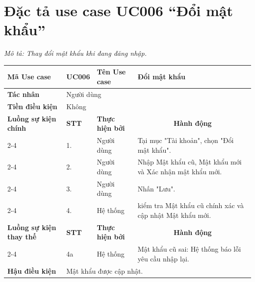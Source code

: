 \section{Đặc tả use case UC006 ``Đổi mật khẩu''}
\textit{Mô tả: Thay đổi mật khẩu khi đang đăng nhập.}
\vspace{0.5cm}

\begingroup
\renewcommand{\arraystretch}{1.5}

\begin{longtable}{|p{2.7cm}|p{0.8cm}|p{2.6cm}|p{7.3cm}|}
\hline
\cellcolor[HTML]{D5F5E3}\textbf{Mã Use case} & \multicolumn{1}{l|}{UC006} & \cellcolor[HTML]{D5F5E3}\textbf{Tên Use case} & Đổi mật khẩu \\ \hline
\cellcolor[HTML]{D5F5E3}\textbf{Tác nhân} & \multicolumn{3}{p{10.7cm}|}{Người dùng} \\ \hline
\cellcolor[HTML]{D5F5E3}\textbf{Tiền điều kiện} & \multicolumn{3}{p{10.7cm}|}{Không} \\ \hline

\cellcolor[HTML]{D5F5E3}\textbf{Luồng sự kiện chính} & \cellcolor[HTML]{FDEBD0}\textbf{STT} & \cellcolor[HTML]{FDEBD0}\textbf{Thực hiện bởi} & \multicolumn{1}{c|}{\cellcolor[HTML]{FDEBD0}\textbf{Hành động}} \\ \cline{2-4} 
\cellcolor[HTML]{D5F5E3} & 1. & Người dùng & Tại mục "Tài khoản", chọn "Đổi mật khẩu". \\ \cline{2-4} 
\cellcolor[HTML]{D5F5E3} & 2. & Người dùng & Nhập Mật khẩu cũ, Mật khẩu mới và Xác nhận mật khẩu mới. \\ \cline{2-4} 
\cellcolor[HTML]{D5F5E3} & 3. & Người dùng & Nhấn "Lưu". \\ \cline{2-4} 
\cellcolor[HTML]{D5F5E3} & 4. & Hệ thống & kiểm tra Mật khẩu cũ chính xác và cập nhật Mật khẩu mới. \\ \hline

\cellcolor[HTML]{D5F5E3}\textbf{Luồng sự kiện thay thế} & \cellcolor[HTML]{FDEBD0}\textbf{STT} & \cellcolor[HTML]{FDEBD0}\textbf{Thực hiện bởi} & \multicolumn{1}{c|}{\cellcolor[HTML]{FDEBD0}\textbf{Hành động}} \\ \cline{2-4} 
\cellcolor[HTML]{D5F5E3} & 4a & Hệ thống & Mật khẩu cũ sai: Hệ thống báo lỗi yêu cầu nhập lại. \\ \hline

\cellcolor[HTML]{D5F5E3}\textbf{Hậu điều kiện} & \multicolumn{3}{p{10.7cm}|}{Mật khẩu được cập nhật.} \\ \hline
\end{longtable}
\endgroup

